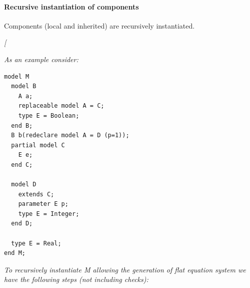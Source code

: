 \documentclass[10pt,a4paper]{report}
\def\doublelabel#1{\label{#1}\hypertarget{#1}{}}
\begin{document}
\paragraph{Recursive instantiation of components}\label{recursive-instantiation-of-components}\doublelabel{recursive-instantiation-of-components}

Components (local and inherited) are recursively instantiated.

\emph{{[}}

\emph{As an example consider: }
\begin{lstlisting}[language=modelica]
model M
  model B
    A a;
    replaceable model A = C;
    type E = Boolean;
  end B;
  B b(redeclare model A = D (p=1));
  partial model C
    E e;
  end C;

  model D
    extends C;
    parameter E p;
    type E = Integer;
  end D;

  type E = Real;
end M;
\end{lstlisting}

\emph{To recursively instantiate M allowing the generation of flat
equation system we have the following steps (not including checks):}
\end{document}
